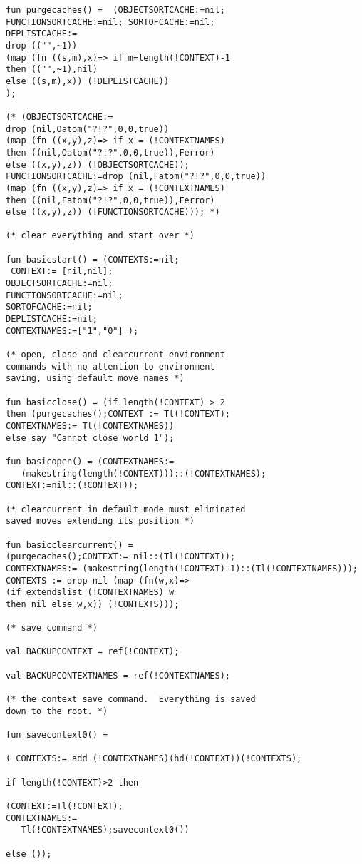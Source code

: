 \documentclass[12pt]{article}
\begin{document}
\begin{verbatim}
fun purgecaches() =  (OBJECTSORTCACHE:=nil;
FUNCTIONSORTCACHE:=nil; SORTOFCACHE:=nil; 
DEPLISTCACHE:=
drop (("",~1)) 
(map (fn ((s,m),x)=> if m=length(!CONTEXT)-1
then (("",~1),nil) 
else ((s,m),x)) (!DEPLISTCACHE))
); 

(* (OBJECTSORTCACHE:=
drop (nil,Oatom("?!?",0,0,true)) 
(map (fn ((x,y),z)=> if x = (!CONTEXTNAMES) 
then ((nil,Oatom("?!?",0,0,true)),Ferror) 
else ((x,y),z)) (!OBJECTSORTCACHE));
FUNCTIONSORTCACHE:=drop (nil,Fatom("?!?",0,0,true)) 
(map (fn ((x,y),z)=> if x = (!CONTEXTNAMES) 
then ((nil,Fatom("?!?",0,0,true)),Ferror) 
else ((x,y),z)) (!FUNCTIONSORTCACHE))); *)

(* clear everything and start over *)

fun basicstart() = (CONTEXTS:=nil;
 CONTEXT:= [nil,nil];
OBJECTSORTCACHE:=nil;
FUNCTIONSORTCACHE:=nil;
SORTOFCACHE:=nil;
DEPLISTCACHE:=nil;
CONTEXTNAMES:=["1","0"] );

(* open, close and clearcurrent environment
commands with no attention to environment
saving, using default move names *)

fun basicclose() = (if length(!CONTEXT) > 2 
then (purgecaches();CONTEXT := Tl(!CONTEXT);
CONTEXTNAMES:= Tl(!CONTEXTNAMES)) 
else say "Cannot close world 1");
  
fun basicopen() = (CONTEXTNAMES:=
   (makestring(length(!CONTEXT)))::(!CONTEXTNAMES);
CONTEXT:=nil::(!CONTEXT));

(* clearcurrent in default mode must eliminated
saved moves extending its position *)

fun basicclearcurrent() = 
(purgecaches();CONTEXT:= nil::(Tl(!CONTEXT));
CONTEXTNAMES:= (makestring(length(!CONTEXT)-1)::(Tl(!CONTEXTNAMES)));
CONTEXTS := drop nil (map (fn(w,x)=>
(if extendslist (!CONTEXTNAMES) w 
then nil else w,x)) (!CONTEXTS)));

(* save command *)

val BACKUPCONTEXT = ref(!CONTEXT);

val BACKUPCONTEXTNAMES = ref(!CONTEXTNAMES);

(* the context save command.  Everything is saved
down to the root. *)

fun savecontext0() =

( CONTEXTS:= add (!CONTEXTNAMES)(hd(!CONTEXT))(!CONTEXTS);

if length(!CONTEXT)>2 then

(CONTEXT:=Tl(!CONTEXT); 
CONTEXTNAMES:=
   Tl(!CONTEXTNAMES);savecontext0())

else ());


\end{verbatim}
\end{document}
